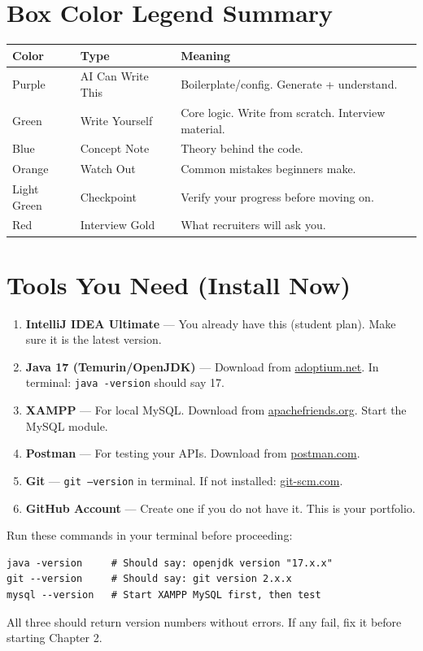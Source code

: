\documentclass[12pt,a4paper]{report}
\newcommand{\code}[1]{\texttt{\textcolor{keywordblue}{#1}}}
\begin{document}
\section{Box Color Legend Summary}

\begin{tabularx}{\textwidth}{@{}llX@{}}
\toprule
\textbf{Color} & \textbf{Type} & \textbf{Meaning} \\
\midrule
Purple & AI Can Write This & Boilerplate/config. Generate + understand. \\
Green & Write Yourself & Core logic. Write from scratch. Interview material. \\
Blue & Concept Note & Theory behind the code. \\
Orange & Watch Out & Common mistakes beginners make. \\
Light Green & Checkpoint & Verify your progress before moving on. \\
Red & Interview Gold & What recruiters will ask you. \\
\bottomrule
\end{tabularx}

\section{Tools You Need (Install Now)}

\begin{enumerate}[leftmargin=2cm]
  \item \textbf{IntelliJ IDEA Ultimate} --- You already have this (student plan). Make sure it is the latest version.
  \item \textbf{Java 17 (Temurin/OpenJDK)} --- Download from \href{https://adoptium.net}{adoptium.net}. In terminal: \code{java -version} should say 17.
  \item \textbf{XAMPP} --- For local MySQL. Download from \href{https://apachefriends.org}{apachefriends.org}. Start the MySQL module.
  \item \textbf{Postman} --- For testing your APIs. Download from \href{https://postman.com}{postman.com}.
  \item \textbf{Git} --- \code{git --version} in terminal. If not installed: \href{https://git-scm.com}{git-scm.com}.
  \item \textbf{GitHub Account} --- Create one if you do not have it. This is your portfolio.
\end{enumerate}

\begin{tcolorbox}[successbox]
Run these commands in your terminal before proceeding:
\begin{lstlisting}[style=bashstyle]
java -version     # Should say: openjdk version "17.x.x"
git --version     # Should say: git version 2.x.x
mysql --version   # Start XAMPP MySQL first, then test
\end{lstlisting}
All three should return version numbers without errors. If any fail, fix it before starting Chapter 2.
\end{tcolorbox}
\end{document}

